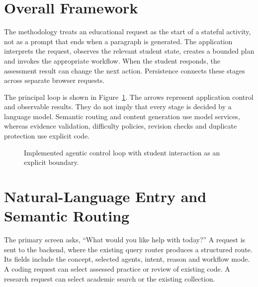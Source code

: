 \section{Overall Framework}
The methodology treats an educational request as the start of a stateful activity, not as a prompt that ends when a paragraph is generated. The application interprets the request, observes the relevant student state, creates a bounded plan and invokes the appropriate workflow. When the student responds, the assessment result can change the next action. Persistence connects these stages across separate browser requests.

The principal loop is shown in Figure~\ref{fig:loop}. The arrows represent application control and observable results. They do not imply that every stage is decided by a language model. Semantic routing and content generation use model services, whereas evidence validation, difficulty policies, revision checks and duplicate protection use explicit code.

\begin{figure}[htbp]\centering
{}
\caption{Implemented agentic control loop with student interaction as an explicit boundary.}\label{fig:loop}
\end{figure}

\section{Natural-Language Entry and Semantic Routing}
The primary screen asks, ``What would you like help with today?'' A request is sent to the backend, where the existing query router produces a structured route. Its fields include the concept, selected agents, intent, reason and workflow mode. A coding request can select assessed practice or review of existing code. A research request can select academic search or the existing collection.

